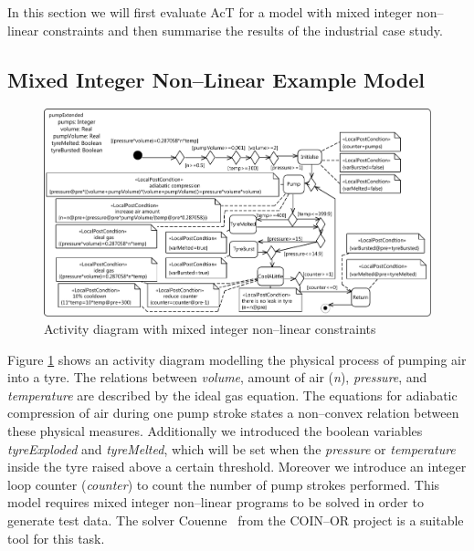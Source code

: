 \documentclass[runningheads,a4paper]{llncs}%
\newcommand{\OCLVar}[1]{\textit{#1}}
\begin{document}
In this section we will first evaluate AcT for a model with mixed integer
non--linear constraints and then summarise the results of the industrial case
study.%
\subsection{Mixed Integer Non--Linear Example Model}
\label{sec:exampleModelNonConvex}
\begin{figure}
\includegraphics[width=\textwidth]{../Thesis/pics/pumpTyre.pdf}
\caption{Activity diagram with mixed integer non--linear constraints}
\label{fig:pumpTyre}
\end{figure}
Figure \ref{fig:pumpTyre} shows an activity diagram modelling the physical
process of pumping air into a tyre. The relations between \OCLVar{volume},
amount of air (\OCLVar{n}), \OCLVar{pressure}, and \OCLVar{temperature} are
described by the ideal gas equation. The equations for adiabatic compression of
air during one pump stroke states a non--convex relation between these physical
measures. Additionally we introduced the boolean variables \OCLVar{tyreExploded}
and \OCLVar{tyreMelted}, which will be set when the \OCLVar{pressure} or
\OCLVar{temperature} inside the tyre raised above a certain threshold. Moreover
we introduce an integer loop counter (\OCLVar{counter}) to count the number of
pump strokes performed. This model requires mixed integer non--linear programs
to be solved in order to generate test data. The solver
Couenne~\cite{Belotti09couenne} from the COIN--OR project is a suitable tool for
this task.%
\end{document}
